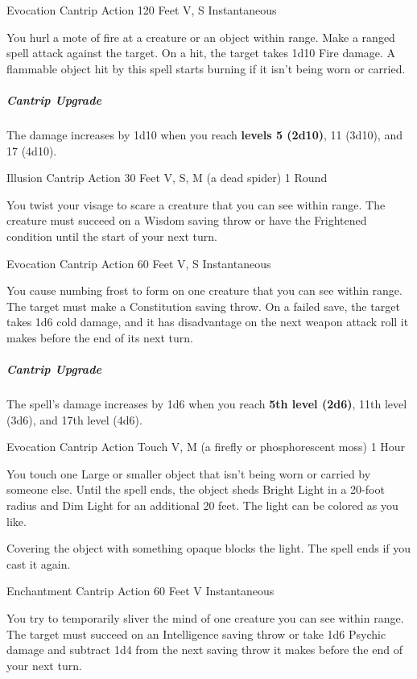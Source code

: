 \documentclass[letterpaper,openany,oneside,twocolumn]{book}
\begin{document}
	{Evocation Cantrip}
	{Action}
	{120 Feet}
	{V, S}
	{Instantaneous}

You hurl a mote of fire at a creature or an object within range. Make a ranged spell attack against the target. On a hit, the target takes 1d10 Fire damage. A flammable object hit by this spell starts burning if it isn't being worn or carried.

\subparagraph*{Cantrip Upgrade} The damage increases by 1d10 when you reach \textbf{levels 5 (2d10)}, 11 (3d10), and 17 (4d10).

	{Illusion Cantrip}
	{Action}
	{30 Feet}
	{V, S, M (a dead spider)}
	{1 Round}

You twist your visage to scare a creature that you can see within range. The creature must succeed on a Wisdom saving throw or have the Frightened condition until the start of your next turn.

	{Evocation Cantrip}
	{Action}
	{60 Feet}
	{V, S}
	{Instantaneous}

You cause numbing frost to form on one creature that you can see within range. The target must make a Constitution saving throw. On a failed save, the target takes 1d6 cold damage, and it has disadvantage on the next weapon attack roll it makes before the end of its next turn.

\subparagraph*{Cantrip Upgrade} The spell's damage increases by 1d6 when you reach \textbf{5th level (2d6)}, 11th level (3d6), and 17th level (4d6).

	{Evocation Cantrip}
	{Action}
	{Touch}
	{V, M (a firefly or phosphorescent moss)}
	{1 Hour}

You touch one Large or smaller object that isn't being worn or carried by someone else. Until the spell ends, the object sheds Bright Light in a 20-foot radius and Dim Light for an additional 20 feet. The light can be colored as you like.

Covering the object with something opaque blocks the light. The spell ends if you cast it again.

	{Enchantment Cantrip}
	{Action}
	{60 Feet}
	{V}
	{Instantaneous}

You try to temporarily sliver the mind of one creature you can see within range. The target must succeed on an Intelligence saving throw or take 1d6 Psychic damage and subtract 1d4 from the next saving throw it makes before the end of your next turn.
\end{document}
